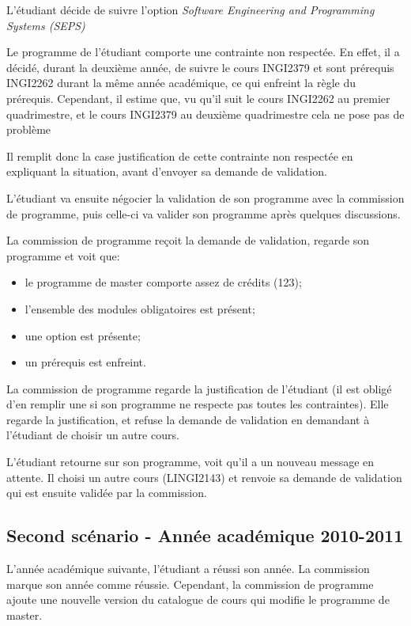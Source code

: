L'étudiant décide de suivre l'option \textit{Software Engineering and Programming Systems (SEPS)}

Le programme de l'étudiant comporte une contrainte non respectée. En effet, il a décidé, durant la deuxième année, de suivre le cours INGI2379 et sont prérequis INGI2262 durant la même année académique, ce qui enfreint la règle du prérequis. Cependant, il estime que, vu qu'il suit le cours INGI2262 au premier quadrimestre, et le cours INGI2379 au deuxième quadrimestre cela ne pose pas de problème

Il remplit donc  la case justification de cette contrainte non respectée en expliquant la situation, avant d'envoyer sa demande de validation. 

L'étudiant va ensuite négocier la validation de son programme avec la commission de programme, puis celle-ci va valider son programme après quelques discussions. 

La commission de programme reçoit la demande de validation, regarde son programme et voit que:
\begin{itemize}
\item le programme de master comporte assez de crédits (123);
\item l'ensemble des modules obligatoires est présent;
\item une option est présente;
\item un prérequis est enfreint.
\end{itemize}

La commission de programme regarde la justification de l'étudiant (il est obligé d'en remplir une si son programme ne respecte pas toutes les contraintes). Elle regarde la justification, et refuse la demande de validation en demandant à l'étudiant de choisir un autre cours. 

L'étudiant retourne sur son programme, voit qu'il a un nouveau message en attente. Il choisi un autre cours (LINGI2143) et renvoie sa demande de validation qui est ensuite validée par la commission.

\subsection{Second scénario - Année académique 2010-2011}
L'année académique suivante, l'étudiant a réussi son année. La commission marque son année comme réussie. Cependant, la commission de programme ajoute une nouvelle version du catalogue de cours qui modifie le programme de master.

